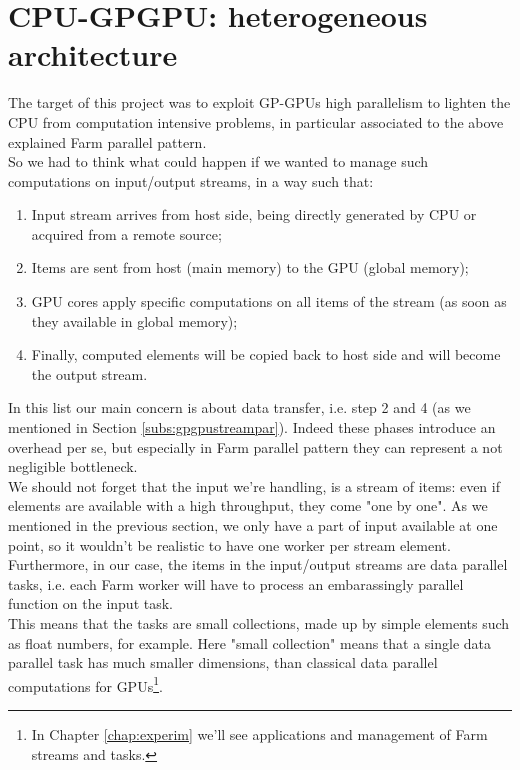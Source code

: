 \section{CPU-GPGPU: heterogeneous architecture}
	The target of this project was to exploit GP-GPUs high parallelism to lighten the CPU from computation intensive problems, in particular associated to the above explained Farm parallel pattern.\\
	So we had to think what could happen if we wanted to manage such computations on input/output streams, in a way such that:
	\begin{enumerate}
		\item Input stream arrives from host side, being directly generated by CPU or acquired from a remote source;
		
		\item Items are sent from host (main memory) to the GPU (global memory);
		
		\item GPU cores apply specific computations on all items of the stream (as soon as they available in global memory);
		
		\item Finally, computed elements will be copied back to host side and will become the output stream. \\
	\end{enumerate}
	In this list our main concern is about data transfer, i.e. step 2 and 4 (as we mentioned in Section \ref{subs:gpgpustreampar}). 
	Indeed these phases introduce an overhead per se, but especially in Farm parallel pattern they can represent a not negligible bottleneck. \\
	We should not forget that the input we're handling, is a stream of items: even if elements are available with a high throughput, they come "one by one". As we mentioned in the previous section, we only have a part of input available at one point, so it wouldn't be realistic to have one worker per stream element.\\
	Furthermore, in our case, the items in the input/output streams are data parallel tasks, i.e. each Farm worker will have to process an embarassingly parallel function on the input task.\\
	This means that the tasks are small collections, made up by simple elements such as float numbers, for example. Here "small collection" means that a single data parallel task has much smaller dimensions, than classical data parallel computations for GPUs\footnote{In Chapter \ref{chap:experim} we'll see applications and management of Farm streams and tasks.}.\\
	
